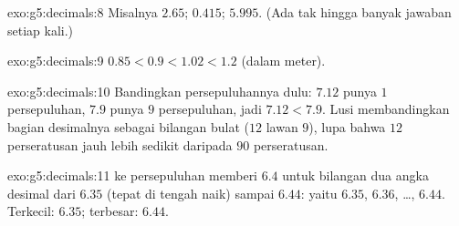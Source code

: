 \begin{solution}{exo:g5:decimals:8}
Misalnya $2.65$; \quad $0.415$; \quad $5.995$. (Ada tak hingga
banyak jawaban setiap kali.)
\end{solution}

\begin{solution}{exo:g5:decimals:9}
$0.85 < 0.9 < 1.02 < 1.2$ (dalam meter).
\end{solution}

\begin{solution}{exo:g5:decimals:10}
Bandingkan persepuluhannya dulu: $7.12$ punya $1$ persepuluhan,
$7.9$ punya $9$ persepuluhan, jadi $7.12 < 7.9$. Lusi membandingkan
bagian desimalnya sebagai bilangan bulat ($12$ lawan $9$), lupa
bahwa $12$ perseratusan jauh lebih sedikit daripada $90$ perseratusan.
\end{solution}

\begin{solution}{exo:g5:decimals:11}
 ke persepuluhan memberi $6.4$ untuk bilangan dua angka
desimal dari $6.35$ (tepat di tengah  naik) sampai $6.44$:
yaitu $6.35$, $6.36$, \dots, $6.44$. Terkecil: $6.35$; terbesar: $6.44$.

\end{solution}
